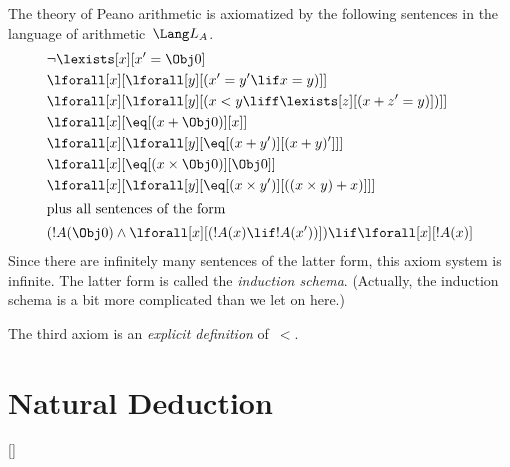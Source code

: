 \begin{ex}
The theory of Peano arithmetic is axiomatized by the following
sentences in the language of arithmetic~$\Lang L_A$.
\begin{align*}
& \lnot\lexists[x][x' = \Obj 0]\\
& \lforall[x][\lforall[y][(x' = y' \lif x = y)]]\\
& \lforall[x][\lforall[y][(x < y \liff \lexists[z][(x + z' = y)])]]\\
& \lforall[x][\eq[(x + \Obj 0)][x]]\\
& \lforall[x][\lforall[y][\eq[(x + y')][(x + y)']]]\\
& \lforall[x][\eq[(x \times \Obj 0)][\Obj 0]]\\
& \lforall[x][\lforall[y][\eq[(x \times y')][((x \times y) + x)]]]\\
\intertext{plus all sentences of the form}
& (!A(\Obj 0) \land \lforall[x][(!A(x) \lif !A(x'))]) \lif \lforall[x][!A(x)]
\end{align*}
Since there are infinitely many sentences of the latter form, this
axiom system is infinite.  The latter form is called the
\emph{induction schema}. (Actually, the induction schema is a bit more
complicated than we let on here.)

The third axiom is an \emph{explicit definition} of~$<$.
\end{ex}

\OLEndChapterHook

\chapter{Natural Deduction}

[\nosection]








